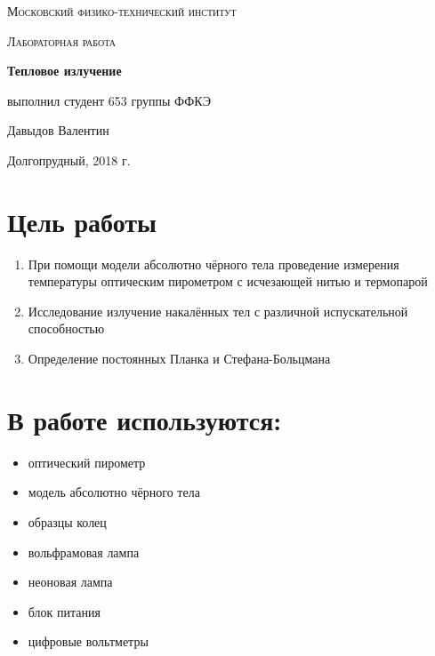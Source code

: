 \documentclass[a4paper]{article}
\begin{document}
\begin{titlepage}
	\centering
	\vspace{5cm}
	{\scshape\LARGE Московский физико-технический институт \par}
	\vspace{4cm}
	{\scshape\Large Лабораторная работа \par}
	\vspace{1cm}
	{\huge\bfseries Тепловое излучение \par}
	\vspace{1cm}
	\vfill
\begin{flushright}
	{\large выполнил студент 653 группы ФФКЭ}\par
	\vspace{0.3cm}
	{\LARGE Давыдов Валентин} \par

\end{flushright}
	

	\vfill

	Долгопрудный, 2018 г.
\end{titlepage}

\section{Цель работы}
\begin{enumerate}
    \item При помощи модели абсолютно чёрного тела проведение измерения температуры оптическим пирометром с исчезающей нитью и термопарой
    \item Исследование излучение накалённых тел с различной испускательной способностью
    \item Определение постоянных Планка и Стефана-Больцмана
\end{enumerate}

\section{В работе используются:}
\begin{itemize}
    \item оптический пирометр
    \item модель абсолютно чёрного тела
    \item образцы колец
    \item вольфрамовая лампа
    \item неоновая лампа
    \item блок питания
    \item цифровые вольтметры
\end{itemize}
\end{document}
